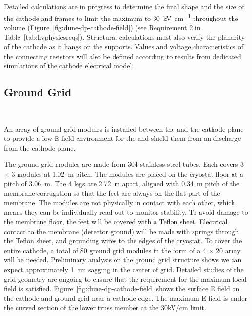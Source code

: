 Detailed calculations are in progress to determine the final shape and the size of the cathode and  frames to %
limit the maximum \efield to \SI{30}{\kV\per\cm}  
throughout the \lar volume (Figure~\ref{fig:dune-dp-cathode-field}) (see Requirement 2 in Table~\ref{tab:hvphysicsreqs}).  Structural calculations must also verify the planarity of the cathode as it hangs on the  supports.
Values and voltage characteristics of the connecting resistors will also be defined according to results from dedicated simulations of the cathode electrical model.


\subsection{Ground Grid}~\label{sec:dp-hv-groundgrid}

An array of ground grid modules is installed between the  and the cathode plane to provide a low E field environment for the  and shield them from an  discharge from the cathode plane.

The ground grid modules are made from 304 stainless steel tubes.  Each covers \num{3} $\times$ \num{3}  modules at \SI{1.02}{\m} pitch. The modules are placed on the cryostat floor at a pitch of \SI{3.06}{\m}. The \num{4} legs are \SI{2.72}{\m} apart, aligned with \SI{0.34}{\m} pitch of the membrane corrugation so that the feet are always on the flat part of the membrane. The modules are not physically in contact with each other, which means they can be individually read out to monitor  stability. To avoid damage to the membrane floor, the feet will be covered with a Teflon  sheet.  Electrical contact to the membrane (detector ground) will be made with springs through the Teflon sheet, and grounding wires to the edges of the cryostat. To cover the entire cathode, a total of \num{80} ground grid modules in the form of a \num{4} $\times$ \num{20} array will be needed. Preliminary analysis on the ground grid structure shows we can expect approximately \SI{1}{\cm} sagging in the center of grid. Detailed studies of the grid geometry are ongoing to ensure that the requirement for the maximum local field is satisfied. Figure~\ref{fig:dune-dp-cathode-field} shows the surface E field on the cathode and ground grid near a cathode edge.  The maximum E field is under the curved section of the lower truss member at the 30kV/cm  limit.

